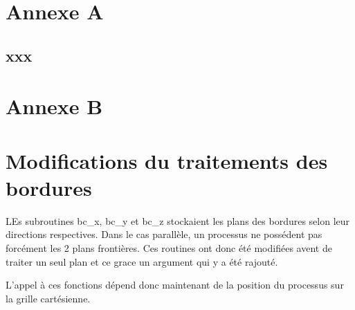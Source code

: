 \section{Annexe A}
\subsection{xxx}
\section{Annexe B}

\section{Modifications du traitements des bordures}
LEs subroutines bc\_x, bc\_y et bc\_z stockaient les plans des bordures selon leur directions respectives. Dans le cas parallèle, un processus ne possédent pas forcément les 2 plans frontières. Ces routines ont donc été modifiées avent de traiter un seul plan et ce grace un argument qui y a été rajouté.

L'appel à ces fonctions dépend donc maintenant de la position du processus sur la grille cartésienne.


